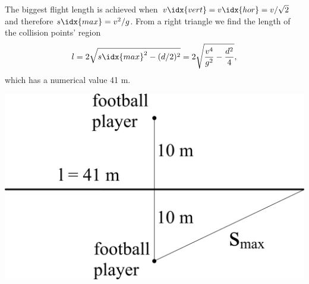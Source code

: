 The biggest flight length is achieved when $v\idx{vert}=v\idx{hor}=v / \sqrt{2}$ and therefore $s\idx{max}=v^2 / g$. From a right triangle we find the length of the collision points’ region
\[
l=2\sqrt{{s\idx{max}}^2-(d/2)^2}=2\sqrt{\frac{v^4}{g^2}-\frac{d^2}{4}},
\] 
which has a numerical value 41 m. 
\begin{center}
\includegraphics[width=0.5\linewidth]{2013-v3g-09-jalgpallurid_ing}
\end{center}
\probend